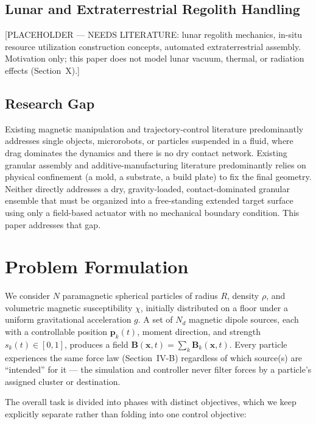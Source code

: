 \documentclass[journal]{IEEEtran}
\begin{document}
\subsection{Lunar and Extraterrestrial Regolith Handling}
[PLACEHOLDER --- NEEDS LITERATURE: lunar regolith mechanics, in-situ
resource utilization construction concepts, automated extraterrestrial
assembly. Motivation only; this paper does not model lunar vacuum,
thermal, or radiation effects (Section~X).]

\subsection{Research Gap}
Existing magnetic manipulation and trajectory-control literature
predominantly addresses single objects, microrobots, or particles suspended
in a fluid, where drag dominates the dynamics and there is no dry contact
network. Existing granular assembly and additive-manufacturing literature
predominantly relies on physical confinement (a mold, a substrate, a
build plate) to fix the final geometry. Neither directly addresses a dry,
gravity-loaded, contact-dominated granular ensemble that must be organized
into a free-standing extended target surface using only a field-based
actuator with no mechanical boundary condition. This paper addresses that
gap.

\section{Problem Formulation}
We consider $N$ paramagnetic spherical particles of radius $R$, density
$\rho$, and volumetric magnetic susceptibility $\chi$, initially distributed
on a floor under a uniform gravitational acceleration $g$. A set of $N_d$
magnetic dipole sources, each with a controllable position
$\mathbf{p}_k(t)$, moment direction, and strength $s_k(t)\in[0,1]$, produces
a field $\mathbf{B}(\mathbf{x},t)=\sum_k \mathbf{B}_k(\mathbf{x},t)$. Every
particle experiences the same force law (Section~IV-B) regardless of which
source(s) are ``intended'' for it --- the simulation and controller never
filter forces by a particle's assigned cluster or destination.

The overall task is divided into phases with distinct objectives, which we
keep explicitly separate rather than folding into one control objective:
\end{document}
